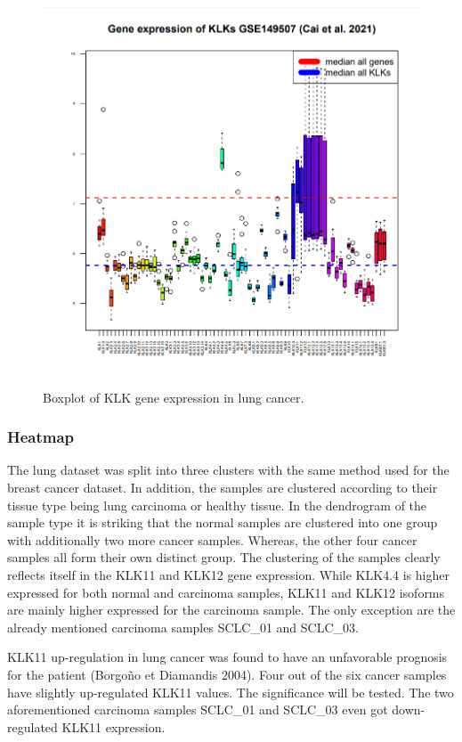 \documentclass[
]{article}
\begin{document}
\begin{figure}

{\centering \includegraphics[width=0.5\linewidth]{images/Boxplot_lung} 

}

\caption{Boxplot of KLK gene expression in lung cancer.}\label{fig:Boxplot - lung }
\end{figure}

\hypertarget{heatmap-1}{%
\subsubsection{Heatmap}\label{heatmap-1}}

The lung dataset was split into three clusters with the same method used
for the breast cancer dataset. In addition, the samples are clustered
according to their tissue type being lung carcinoma or healthy tissue.
In the dendrogram of the sample type it is striking that the normal
samples are clustered into one group with additionally two more cancer
samples. Whereas, the other four cancer samples all form their own
distinct group. The clustering of the samples clearly reflects itself in
the KLK11 and KLK12 gene expression. While KLK4.4 is higher expressed
for both normal and carcinoma samples, KLK11 and KLK12 isoforms are
mainly higher expressed for the carcinoma sample. The only exception are
the already mentioned carcinoma samples SCLC\_01 and SCLC\_03.

KLK11 up-regulation in lung cancer was found to have an unfavorable
prognosis for the patient (Borgoño et Diamandis 2004). Four out of the
six cancer samples have slightly up-regulated KLK11 values. The
significance will be tested. The two aforementioned carcinoma samples
SCLC\_01 and SCLC\_03 even got down-regulated KLK11 expression.
\end{document}
